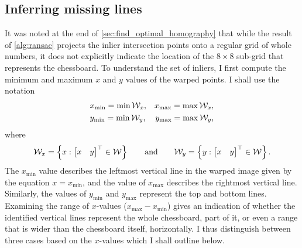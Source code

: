 \documentclass[../report.tex]{subfiles}
\begin{document}
\subsection{Inferring missing lines}
\label{sec:infer_missing_lines}
It was noted at the end of \cref{sec:find_optimal_homography} that while the result of \cref{alg:ransac} projects the inlier intersection points onto a regular grid of whole numbers, it does not explicitly indicate the location of the $8\times 8$ sub-grid that represents the chessboard.
To understand the set of inliers, I first compute the minimum and maximum $x$ and $y$ values of the warped points.
I shall use the notation
\begin{align}
    &x_\text{min} = \min {\mathcal{W}}_x,
    &x_\text{max} = \max {\mathcal{W}}_x,\label{eq:infer_lines_x_extrema}\\
    &y_\text{min} = \min {\mathcal{W}}_y,
    &y_\text{max} = \max {\mathcal{W}}_y,
\end{align}
where
\begin{equation}
    \sW_x = \left\{ x : \begin{bmatrix}
        x & y
    \end{bmatrix}^\top \in \sW \right\}%
    \qquad \text{and} \qquad%
    \sW_y = \left\{ y : \begin{bmatrix}
        x & y
    \end{bmatrix}^\top \in \sW \right\}.
\end{equation}
The $x_\text{min}$ value describes the leftmost vertical line in the warped image given by the equation $x=x_\text{min}$, and the value of $x_\text{max}$ describes the rightmost vertical line. 
Similarly, the values of $y_\text{min}$ and $y_\text{max}$ represent the top and bottom lines.
Examining the range of $x$-values ($x_\text{max}-x_\text{min}$) gives an indication of whether the identified vertical lines represent the whole chessboard, part of it, or even a range that is wider than the chessboard itself, horizontally.
I thus distinguish between three cases based on the $x$-values which I shall outline below. 
\end{document}
